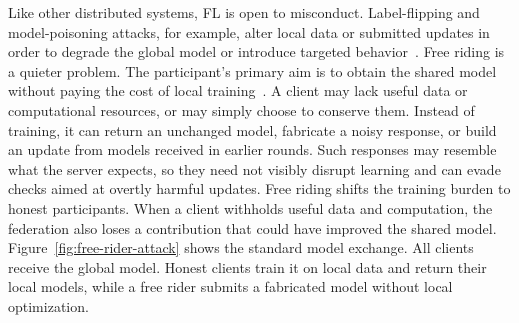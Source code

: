 \documentclass[journal]{IEEEtran}
\begin{document}
Like other distributed systems, FL is open to misconduct. Label-flipping and
model-poisoning attacks, for example, alter local data or submitted updates
in order to degrade the global model or introduce targeted
behavior~\cite{kairouz2021advances,bagdasaryan2020backdoor}. Free riding is
a quieter problem. The participant's primary aim is to obtain the shared
model without paying the cost of local
training~\cite{lin2019freeriders,fraboni2021freerider}. A client may lack
useful data or computational resources, or may simply choose to conserve
them. Instead of training, it can return an unchanged model, fabricate a
noisy response, or build an update from models received in earlier rounds.
Such responses may resemble what the server expects, so they need not
visibly disrupt learning and can evade checks aimed at overtly harmful
updates. Free riding shifts the training burden to honest participants. When
a client withholds useful data and computation, the federation also loses a
contribution that could have improved the shared model.
Figure~\ref{fig:free-rider-attack} shows the standard model exchange.
All clients receive the global model. Honest clients train it on local
data and return their local models, while a free rider submits a fabricated
model without local optimization.
\end{document}
